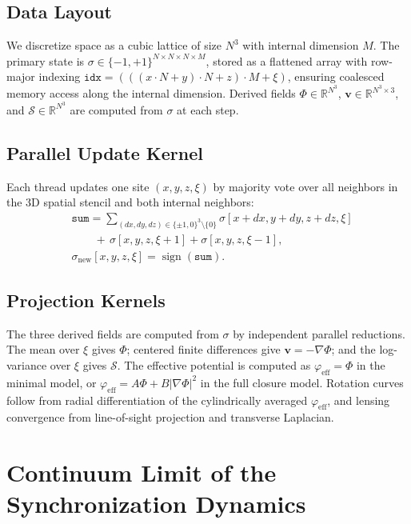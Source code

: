 \documentclass[11pt, a4paper, twocolumn]{article}
\newcommand{\Sfield}{\mathcal{S}}
\begin{document}
{\subsection{Data Layout}

We discretize space as a cubic lattice of size $N^3$ with internal dimension
$M$. The primary state is $\sigma \in \{-1,+1\}^{N\times N\times N\times M}$,
stored as a flattened array with row-major indexing
$\texttt{idx} = (((x\cdot N + y)\cdot N + z)\cdot M + \xi)$, ensuring
coalesced memory access along the internal dimension. Derived fields
$\Phi \in \mathbb{R}^{N^3}$, $\mathbf{v} \in \mathbb{R}^{N^3\times 3}$, and
$\Sfield \in \mathbb{R}^{N^3}$ are computed from $\sigma$ at each step.

\subsection{Parallel Update Kernel}

Each thread updates one site $(x,y,z,\xi)$ by majority vote over all neighbors
in the 3D spatial stencil and both internal neighbors:
\begin{align*}
&\texttt{sum} = \sum_{(dx,dy,dz)\in\{{\pm 1, 0\}}^3\setminus\{0\}} \sigma[x{+}dx,y{+}dy,z{+}dz,\xi] \\
&\qquad +\, \sigma[x,y,z,\xi{+}1] + \sigma[x,y,z,\xi{-}1], \\
&\sigma_{\mathrm{new}}[x,y,z,\xi] = \operatorname{sign}(\texttt{sum}).
\end{align*}

\subsection{Projection Kernels}

The three derived fields are computed from $\sigma$ by independent parallel
reductions. The mean over $\xi$ gives $\Phi$; centered finite differences give
$\mathbf{v} = -\nabla\Phi$; and the log-variance over $\xi$ gives $\Sfield$.
The effective potential is computed as $\varphi_{\mathrm{eff}} = \Phi$ in the
minimal model, or $\varphi_{\mathrm{eff}} = A\Phi + B|\nabla\Phi|^2$ in the
full closure model. Rotation curves follow from radial differentiation of the
cylindrically averaged $\varphi_{\mathrm{eff}}$, and lensing convergence from
line-of-sight projection and transverse Laplacian.

\section{Continuum Limit of the Synchronization Dynamics}

}
\end{document}
